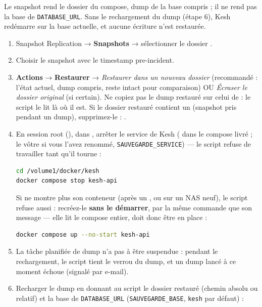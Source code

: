 \documentclass[a4paper,11pt,oneside]{article}
\begin{document}
Le snapshot rend le dossier du compose, dump de la base compris ; il ne rend pas la base de \texttt{DATABASE\_URL}. Sans le rechargement du dump (étape 6), Kesh redémarre sur la base actuelle, et aucune écriture n'est restaurée.

\begin{enumerate}
    \item Snapshot Replication → \textbf{Snapshots} → sélectionner le dossier .
    \item Choisir le snapshot avec le timestamp pre-incident.
    \item \textbf{Actions} → \textbf{Restaurer} → \emph{Restaurer dans un nouveau dossier} (recommandé : l'état actuel, dump compris, reste intact pour comparaison) OU \emph{Écraser le dossier original} (si certain). Ne copiez pas le dump restauré sur celui de  : le script le lit là où il est. Si le dossier restauré contient un  (snapshot pris pendant un dump), supprimez-le : .
    \item En session root (), dans , arrêter le service de Kesh ( dans le compose livré ; le vôtre si vous l'avez renommé, \texttt{SAUVEGARDE\_SERVICE}) --- le script refuse de travailler tant qu'il tourne :
\begin{lstlisting}[language=bash]
cd /volume1/docker/kesh
docker compose stop kesh-api
\end{lstlisting}
    Si  ne montre plus son conteneur (après un , ou sur un NAS neuf), le script refuse aussi : recréez-le \textbf{sans le démarrer}, par la même commande que son message --- elle lit le compose entier,  doit donc être en place :
\begin{lstlisting}[language=bash]
docker compose up --no-start kesh-api
\end{lstlisting}
    \item La tâche planifiée de dump n'a pas à être suspendue : pendant le rechargement, le script tient le verrou du dump, et un dump lancé à ce moment échoue (signalé par e-mail).
    \item Recharger le dump en donnant au script le dossier  restauré (chemin absolu ou relatif) et la base de \texttt{DATABASE\_URL} (\texttt{SAUVEGARDE\_BASE}, \texttt{kesh} par défaut) :
\begin{lstlisting}[language=bash]

\end{lstlisting}
\end{enumerate}
\end{document}
